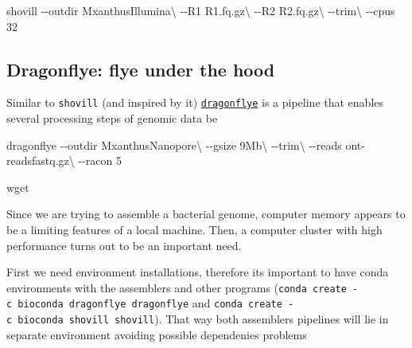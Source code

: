 \documentclass[
  letterpaper,
  DIV=11,
  numbers=noendperiod]{scrreprt}
\newenvironment{Shaded}{\begin{snugshade}}{\end{snugshade}}
\newcommand{\AttributeTok}[1]{\textcolor[rgb]{0.40,0.46,0.14}{#1}}
\newcommand{\DataTypeTok}[1]{\textcolor[rgb]{0.68,0.00,0.00}{#1}}
\newcommand{\ExtensionTok}[1]{\textcolor[rgb]{0.00,0.46,0.62}{#1}}
\newcommand{\FunctionTok}[1]{\textcolor[rgb]{0.28,0.35,0.67}{#1}}
\newcommand{\NormalTok}[1]{\textcolor[rgb]{0.00,0.46,0.62}{#1}}
\begin{document}
\begin{Shaded}
\begin{Highlighting}[]
\ExtensionTok{shovill} \AttributeTok{{-}{-}outdir}\NormalTok{ MxanthusIllumina}\DataTypeTok{\textbackslash{}}
        \AttributeTok{{-}{-}R1}\NormalTok{ R1.fq.gz}\DataTypeTok{\textbackslash{}}
        \AttributeTok{{-}{-}R2}\NormalTok{ R2.fq.gz}\DataTypeTok{\textbackslash{}}
        \AttributeTok{{-}{-}trim}\DataTypeTok{\textbackslash{}}
        \AttributeTok{{-}{-}cpus}\NormalTok{ 32}
\end{Highlighting}
\end{Shaded}

\hypertarget{dragonflye-flye-under-the-hood}{%
\subsection*{Dragonflye: flye under the
hood}\label{dragonflye-flye-under-the-hood}}

Similar to \texttt{shovill} (and inspired by it)
\href{}{\texttt{dragonflye}} is a pipeline that enables several
processing steps of genomic data be

\begin{Shaded}
\begin{Highlighting}[]
\ExtensionTok{dragonflye} \AttributeTok{{-}{-}outdir}\NormalTok{ MxanthusNanopore}\DataTypeTok{\textbackslash{}}
           \AttributeTok{{-}{-}gsize}\NormalTok{ 9Mb}\DataTypeTok{\textbackslash{}}
           \AttributeTok{{-}{-}trim}\DataTypeTok{\textbackslash{}}
           \AttributeTok{{-}{-}reads}\NormalTok{ ont{-}readsfastq.gz}\DataTypeTok{\textbackslash{}}
           \AttributeTok{{-}{-}racon}\NormalTok{ 5}
\end{Highlighting}
\end{Shaded}

\begin{Shaded}
\begin{Highlighting}[]
\FunctionTok{wget}
\end{Highlighting}
\end{Shaded}

Since we are trying to assemble a bacterial genome, computer memory
appears to be a limiting features of a local machine. Then, a computer
cluster with high performance turns out to be an important need.

First we need environment installations, therefore its important to have
conda environments with the assemblers and other programs
(\texttt{conda\ create\ -c\ bioconda\ dragonflye\ dragonflye} and
\texttt{conda\ create\ -c\ bioconda\ shovill\ shovill}). That way both
assemblers pipelines will lie in separate environment avoiding possible
dependenies problems
\end{document}
